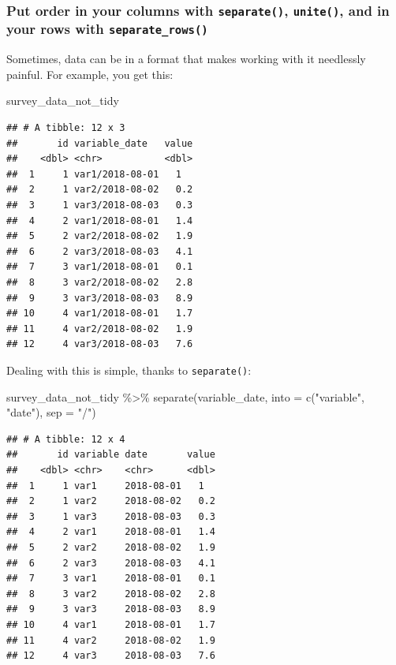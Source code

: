 \documentclass[
]{article}
\newenvironment{Shaded}{\begin{snugshade}}{\end{snugshade}}
\newcommand{\AttributeTok}[1]{\textcolor[rgb]{0.77,0.63,0.00}{#1}}
\newcommand{\FunctionTok}[1]{\textcolor[rgb]{0.00,0.00,0.00}{#1}}
\newcommand{\NormalTok}[1]{#1}
\newcommand{\SpecialCharTok}[1]{\textcolor[rgb]{0.00,0.00,0.00}{#1}}
\newcommand{\StringTok}[1]{\textcolor[rgb]{0.31,0.60,0.02}{#1}}
\begin{document}
\hypertarget{put-order-in-your-columns-with-separate-unite-and-in-your-rows-with-separate_rows}{%
\subsubsection{\texorpdfstring{Put order in your columns with \texttt{separate()}, \texttt{unite()}, and in your rows with \texttt{separate\_rows()}}{Put order in your columns with separate(), unite(), and in your rows with separate\_rows()}}\label{put-order-in-your-columns-with-separate-unite-and-in-your-rows-with-separate_rows}}

Sometimes, data can be in a format that makes working with it needlessly painful. For example, you
get this:

\begin{Shaded}
\begin{Highlighting}[]
\NormalTok{survey\_data\_not\_tidy}
\end{Highlighting}
\end{Shaded}

\begin{verbatim}
## # A tibble: 12 x 3
##       id variable_date   value
##    <dbl> <chr>           <dbl>
##  1     1 var1/2018-08-01   1  
##  2     1 var2/2018-08-02   0.2
##  3     1 var3/2018-08-03   0.3
##  4     2 var1/2018-08-01   1.4
##  5     2 var2/2018-08-02   1.9
##  6     2 var3/2018-08-03   4.1
##  7     3 var1/2018-08-01   0.1
##  8     3 var2/2018-08-02   2.8
##  9     3 var3/2018-08-03   8.9
## 10     4 var1/2018-08-01   1.7
## 11     4 var2/2018-08-02   1.9
## 12     4 var3/2018-08-03   7.6
\end{verbatim}

Dealing with this is simple, thanks to \texttt{separate()}:

\begin{Shaded}
\begin{Highlighting}[]
\NormalTok{survey\_data\_not\_tidy }\SpecialCharTok{\%\textgreater{}\%}
    \FunctionTok{separate}\NormalTok{(variable\_date, }\AttributeTok{into =} \FunctionTok{c}\NormalTok{(}\StringTok{"variable"}\NormalTok{, }\StringTok{"date"}\NormalTok{), }\AttributeTok{sep =} \StringTok{"/"}\NormalTok{)}
\end{Highlighting}
\end{Shaded}

\begin{verbatim}
## # A tibble: 12 x 4
##       id variable date       value
##    <dbl> <chr>    <chr>      <dbl>
##  1     1 var1     2018-08-01   1  
##  2     1 var2     2018-08-02   0.2
##  3     1 var3     2018-08-03   0.3
##  4     2 var1     2018-08-01   1.4
##  5     2 var2     2018-08-02   1.9
##  6     2 var3     2018-08-03   4.1
##  7     3 var1     2018-08-01   0.1
##  8     3 var2     2018-08-02   2.8
##  9     3 var3     2018-08-03   8.9
## 10     4 var1     2018-08-01   1.7
## 11     4 var2     2018-08-02   1.9
## 12     4 var3     2018-08-03   7.6
\end{verbatim}
\end{document}

